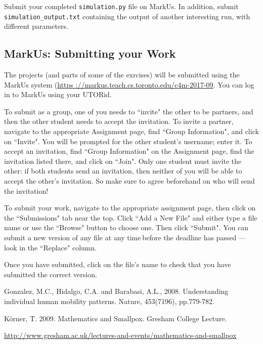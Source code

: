 \documentclass{assignment}
\begin{document}
Submit your completed \texttt{simulation.py} file on MarkUs. In addition, submit \texttt{simulation\_output.txt} containing the output of another interesting run, with different parameters.

\subsection*{MarkUs: Submitting your Work}

The projects (and parts of some of the exrcises) will be submitted using the MarkUs system (\url{https
://markus.teach.cs.toronto.edu/c4m-2017-09}. You can log in to MarkUs using your UTORid.

To submit as a group, one of you needs to ``invite" the other to be partners, and then the other student needs to accept the invitation. To invite a partner, navigate to the appropriate Assignment page, find ``Group Information", and click on ``Invite". You will be prompted for the other student's username; enter it. To accept an invitation, find ``Group Information" on the Assignment page, find the invitation listed there, and click on ``Join". Only one student must invite the other: if both students send an invitation, then neither of you will be able to accept the other's invitation. So make sure to agree beforehand on who will send the invitation!

To submit your work, navigate to the appropriate assignment page, then click on the ``Submissions" tab near the top. Click ``Add a New File" and either type a file name or use the ``Browse" button to choose one. Then click ``Submit". You can submit a new version of any file at any time before the deadline has passed — look in the ``Replace" column. 

Once you have submitted, click on the file's name to check that you have submitted the correct version.

\begin{thebibliography}{1}

 Gonzalez, M.C., Hidalgo, C.A. and Barabasi, A.L., 2008. Understanding individual human mobility patterns. Nature, 453(7196), pp.779-782.

 K{\"o}rner, T. 2009. Mathematics and Smallpox. Gresham College Lecture.

\url{http://www.gresham.ac.uk/lectures-and-events/mathematics-and-smallpox}
\end{thebibliography}
\end{document}
